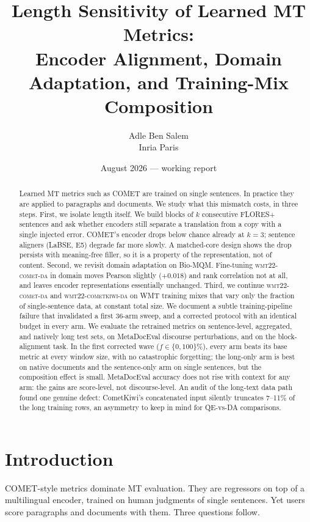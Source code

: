 \documentclass[11pt]{article}
\title{Length Sensitivity of Learned MT Metrics:\\
Encoder Alignment, Domain Adaptation, and Training-Mix Composition}
\author{Adle Ben Salem\\ \small Inria Paris}
\date{August 2026 --- working report}
\newcommand{\cometda}{\textsc{wmt22-comet-da}}
\newcommand{\kiwi}{\textsc{wmt22-cometkiwi-da}}
\begin{document}
\maketitle

\begin{abstract}
Learned MT metrics such as COMET are trained on single sentences.
In practice they are applied to paragraphs and documents.
We study what this mismatch costs, in three steps.
First, we isolate length itself.
We build blocks of $k$ consecutive FLORES+ sentences and ask whether encoders still separate a translation from a copy with a single injected error.
COMET's encoder drops below chance already at $k{=}3$; sentence aligners (LaBSE, E5) degrade far more slowly.
A matched-core design shows the drop persists with meaning-free filler, so it is a property of the representation, not of content.
Second, we revisit domain adaptation on Bio-MQM.
Fine-tuning \cometda{} in domain moves Pearson slightly ($+0.018$) and rank correlation not at all, and leaves encoder representations essentially unchanged.
Third, we continue \cometda{} and \kiwi{} on WMT training mixes that vary only the fraction of single-sentence data, at constant total size.
We document a subtle training-pipeline failure that invalidated a first 36-arm sweep, and a corrected protocol with an identical budget in every arm.
We evaluate the retrained metrics on sentence-level, aggregated, and natively long test sets, on MetaDocEval discourse perturbations, and on the block-alignment task.
In the first corrected wave ($f \in \{0,100\}\%$), every arm beats its base metric at every window size, with no catastrophic forgetting; the long-only arm is best on native documents and the sentence-only arm on single sentences, but the composition effect is small.
MetaDocEval accuracy does not rise with context for any arm: the gains are score-level, not discourse-level.
An audit of the long-text data path found one genuine defect: CometKiwi's concatenated input silently truncates 7--11\% of the long training rows, an asymmetry to keep in mind for QE-vs-DA comparisons.
\end{abstract}

\section{Introduction}

COMET-style metrics dominate MT evaluation.
They are regressors on top of a multilingual encoder, trained on human judgments of single sentences.
Yet users score paragraphs and documents with them.
Three questions follow.
\end{document}
